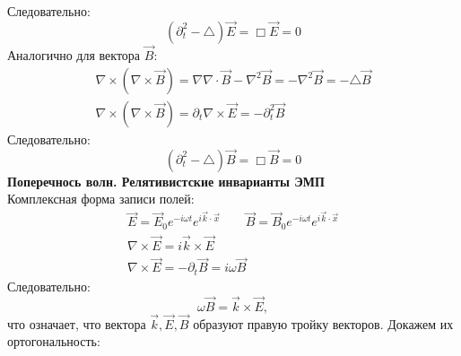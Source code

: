 Следовательно:
$$(\partial^2_t - \triangle) \vec E = \Box \vec E = 0$$
Аналогично для вектора $\vec B$: 
\begin {gather*}
\nabla \times \left(\nabla \times \vec B\right) = \nabla\nabla \cdot \vec B - \nabla^2 \vec B = -\nabla^2\vec B = -\triangle \vec B\\
\nabla \times \left(\nabla \times \vec B\right) = \partial_t \nabla \times \vec E = -\partial^2_t \vec B
 \end{gather*}
Следовательно:
$$(\partial^2_t - \triangle) \vec B = \Box \vec B = 0$$
\textbf{Поперечнось волн. Релятивистские инварианты ЭМП}\\
Комплексная форма записи полей:
\begin{gather*}
\vec E = \vec E_0 e^{-i\omega t} e^{i \vec k \cdot \vec x}\qquad
\vec B = \vec B_0 e^{-i\omega t} e^{i \vec k \cdot \vec x}\\
\nabla \times \vec E = i \vec k \times \vec E\\
\nabla \times \vec E = -\partial_t \vec B = i\omega \vec B 
\end{gather*}
Следовательно:
$$\omega \vec B = \vec k \times \vec E,$$
что означает, что вектора $\vec k, \vec E, \vec B$ образуют правую тройку векторов. Докажем их ортогональность:

